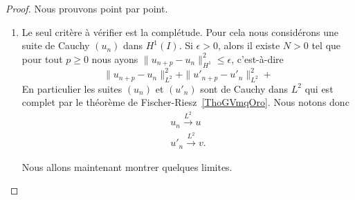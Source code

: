 \begin{proof}
    Nous prouvons point par point.
    \begin{enumerate}
        \item
            Le seul critère à vérifier est la complétude. Pour cela nous considérons une suite de Cauchy \( (u_n)\) dans \( H^1(I)\). Si \( \epsilon>0\), alors il existe \( N>0\) tel que pour tout \( p\geq 0\) nous ayons \( \| u_{n+p}-u_n \|_{H^1}^2\leq \epsilon\), c'est-à-dire
            \begin{equation}
                \| u_{n+p}-u_n \|^2_{L^2}+\| u'_{n+p}-u'_n \|^2_{L^2}+
            \end{equation}
            En particulier les suites \( (u_n)\) et \( (u'_n)\) sont de Cauchy dans \( L^2\) qui est complet par le théorème de Fischer-Riesz~\ref{ThoGVmqOro}. Nous notons donc
            \begin{subequations}
                \begin{align}
                    u_n\stackrel{L^2}{\to}u\\
                    u'_n\stackrel{L^2}{\to}v.
                \end{align}
            \end{subequations}

            Nous allons maintenant montrer quelques limites.
\end{enumerate}
\end{proof}
